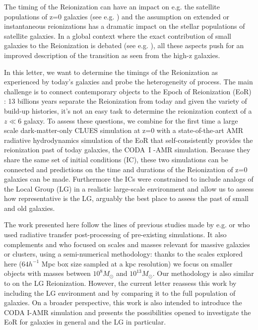 \documentclass[twocolumn]{aastex61}
\begin{document}
The timing of the Reionization can have an impact on e.g. the satellite populations of z=0 galaxies (see e.g. \citet{KOP9,BUS10,OCV11,ILI11,OCV14,GIL15})
and the assumption on extended or instantaneous reionizations has a dramatic impact on the stellar populations of satellite galaxies. In a global context where the exact contribution of small galaxies to the Reionization is debated (see e.g. \citet{BOU14,FIN15}), all these aspects push for an improved description of the transition as seen from the high-z galaxies. 

In this letter, we want to determine the timings of the Reionization as experienced by today's galaxies and probe the heterogeneity of process. The main challenge is to connect contemporary objects to the Epoch of Reionization (EoR) : 13 billions years separate the Reionization from today and given the variety of build-up histories, it's not an easy task to determine the reionization context of a $z\ll6$ galaxy. To assess these questions, we combine for the first time a large scale dark-matter-only CLUES simulation at z=0 with a state-of-the-art AMR radiative hydrodynamics simulation of the EoR that self-consistently provides the reionization past of today galaxies, the CODA~I -AMR simulation. Because they share the same set of initial conditions (IC), these two simulations can be connected and predictions on the time and durations of the Reionization of z=0 galaxies can be made. Furthermore the ICs were constrained to include analogs of the Local Group (LG) in a realistic large-scale environment and allow us to assess how representative is the LG, arguably the best place to assess the past of small and old galaxies.  



The work presented here follow the lines of previous studies made by e.g. \citet{WEI07} or \citet{DIX17} who used radiative transfer post-processing of pre-existing simulations. It also complements \citet{ALV9} and \citet{LI14} who focused on scales and masses relevant for massive galaxies or clusters, using a semi-numerical methodology: thanks to the scales explored here ($64 h^{-1}$ Mpc box size sampled at a kpc resolution) we focus on smaller objects with masses between $10^8 M_\odot$ and $10^{13} M_\odot$. 
Our methodology is also similar to \citet{OCV14} on the LG Reionization. However, the current letter reassess this work by including the LG environment and by comparing it to the full population of galaxies. On a broader perspective, this work is also intended to introduce the CODA I-AMR simulation and presents the possibilities opened to investigate the EoR for galaxies in general and the LG in particular.
\end{document}
